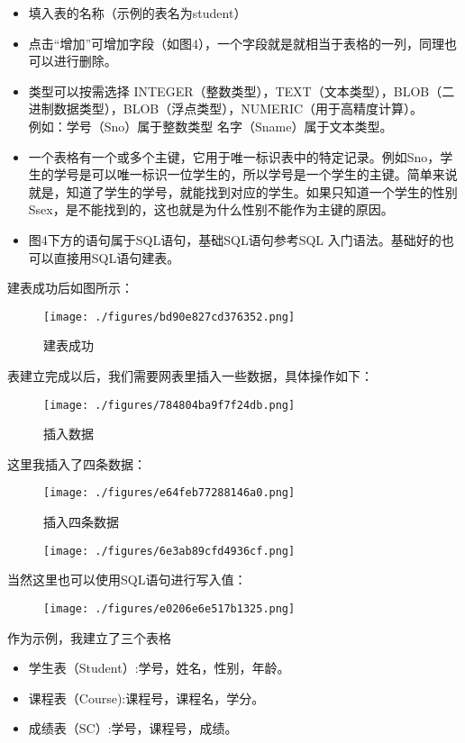 \begin{itemize}
\item 填入表的名称（示例的表名为student）
\item 点击“增加”可增加字段（如图4），一个字段就是就相当于表格的一列，同理也可以进行删除。
\item 类型可以按需选择 INTEGER（整数类型），TEXT（文本类型），BLOB（二进制数据类型），BLOB（浮点类型），NUMERIC（用于高精度计算）。
\\例如：学号（Sno）属于整数类型  名字（Sname）属于文本类型。
\item 一个表格有一个或多个主键，它用于唯一标识表中的特定记录。例如Sno，学生的学号是可以唯一标识一位学生的，所以学号是一个学生的主键。简单来说就是，知道了学生的学号，就能找到对应的学生。如果只知道一个学生的性别Ssex，是不能找到的，这也就是为什么性别不能作为主键的原因。
\item 图4下方的语句属于SQL语句，基础SQL语句参考SQL 入门语法。基础好的也可以直接用SQL语句建表。
\end{itemize}

建表成功后如图所示：
\begin{figure}[ht]
\centering
\texttt{[image: ./figures/bd90e827cd376352.png]}
\caption{建表成功} \label{fig_SQLint_4}
\end{figure}

表建立完成以后，我们需要网表里插入一些数据，具体操作如下：
\begin{figure}[ht]
\centering
\texttt{[image: ./figures/784804ba9f7f24db.png]}
\caption{插入数据} \label{fig_SQLint_6}
\end{figure}
这里我插入了四条数据：
\begin{figure}[ht]
\centering
\texttt{[image: ./figures/e64feb77288146a0.png]}
\caption{插入四条数据} \label{fig_SQLint_7}
\end{figure}

\begin{figure}[ht]
\centering
\texttt{[image: ./figures/6e3ab89cfd4936cf.png]}
\caption{} \label{fig_SQLint_8}
\end{figure}
当然这里也可以使用SQL语句进行写入值：
\begin{figure}[ht]
\centering
\texttt{[image: ./figures/e0206e6e517b1325.png]}
\caption{} \label{fig_SQLint_9}
\end{figure}
作为示例，我建立了三个表格
\begin{itemize}
\item 学生表（Student）:学号，姓名，性别，年龄。
\item 课程表（Course):课程号，课程名，学分。
\item 成绩表（SC）:学号，课程号，成绩。
\end{itemize}

